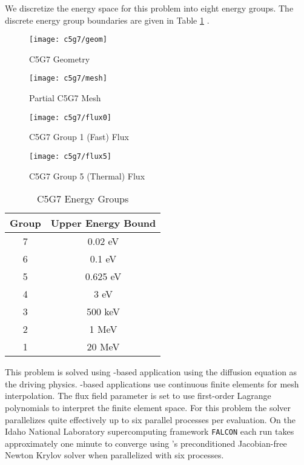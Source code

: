 We discretize the energy space for this problem into eight energy groups.  
The discrete energy group boundaries are
given in Table \ref{tab:c5g7 energy} \cite{c5g7}.

\begin{figure}[htb]
  \centering
  \texttt{[image: c5g7/geom]}
  \caption{C5G7 Geometry}
  \label{fig:c5g7 geom}
\end{figure}
\begin{figure}[htb]
  \centering
  \texttt{[image: c5g7/mesh]}
  \caption{Partial C5G7 Mesh}
  \label{fig:c5g7 mesh}
\end{figure}
\begin{figure}[htb]
  \centering
  \texttt{[image: c5g7/flux0]}
  \caption{C5G7 Group 1 (Fast) Flux}
  \label{fig:c5g7 flux0}
\end{figure}
\begin{figure}[htb]
  \centering
  \texttt{[image: c5g7/flux5]}
  \caption{C5G7 Group 5 (Thermal) Flux}
  \label{fig:c5g7 flux1}
\end{figure}

\begin{table}
  \centering{}
  \begin{tabular}{c c}
    Group & Upper Energy Bound \\ \hline
    7 & 0.02 eV\\
    6 & 0.1 eV\\
    5 & 0.625 eV\\
    4 & 3 eV\\
    3 & 500 keV \\
    2 & 1 MeV \\
    1 & 20 MeV
  \end{tabular}
  \caption{C5G7 Energy Groups}
  \label{tab:c5g7 energy}
\end{table}
This problem is solved using \moose{}-based application \rattlesnake{} \cite{rattlesnake} using the diffusion
equation as the driving physics.  \moose{}-based applications use continuous finite elements for mesh interpolation.  
The flux field parameter is set to use first-order Lagrange polynomials to
interpret the finite element space.  
For this problem the \rattlesnake{} solver parallelizes quite effectively up to six
parallel processes per evaluation. On the Idaho National Laboratory supercomputing framework \texttt{FALCON} each
run takes approximately one minute to converge using \moose{}'s preconditioned Jacobian-free Newton Krylov
solver \cite{moose} when parallelized with six processes.

